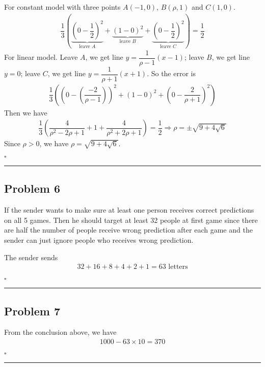 \documentclass[12pt]{article}
\newcommand*{\QEDB}{\hfill\ensuremath{\square}}
\newcommand{\ParTh}[1]{\left(#1\right)}
\newcommand{\horrule}[1]{\rule{\linewidth}{#1}}
\begin{document}
For constant model with three points $A\ParTh{-1,0}$, $B\ParTh{\rho,1}$ and $C\ParTh{1,0}$.
\begin{align}
\dfrac{1}{3}\ParTh{\underbrace{\ParTh{0-\dfrac{1}{2}}^2}_{\text{leave }A}+\underbrace{\ParTh{1-0}^2}_{\text{leave }B}+\underbrace{\ParTh{0-\dfrac{1}{2}}^2}_{\text{leave }C}}=\dfrac{1}{2}
\end{align}
For linear model. Leave $A$, we get line $y=\dfrac{1}{\rho-1}\ParTh{x-1}$; leave $B$, we get line $y=0$; leave $C$, we get line $y=\dfrac{1}{\rho+1}\ParTh{x+1}$. So the error is
\begin{align}
\dfrac{1}{3}\ParTh{\ParTh{0-\ParTh{\dfrac{-2}{\rho-1}}}^2+\ParTh{1-0}^2+\ParTh{0-\dfrac{2}{\rho+1}}^2}
\end{align}
Then we have
\begin{align}
\dfrac{1}{3}\ParTh{\dfrac{4}{{\rho^2-2\rho+1}}+1+\dfrac{4}{{\rho^2+2\rho+1}}}=\dfrac{1}{2}\Rightarrow\rho=\pm\sqrt{9+4\sqrt{6}}
\end{align}
Since $\rho>0$, we have $\rho=\sqrt{9+4\sqrt{6}}$.

\QEDB

\horrule{0.5pt}

\subsection*{Problem 6}

If the sender wants to make sure at least one person receives correct predictions on all 5 games. Then he should target at least 32 people at first game since there are half the number of people receive wrong prediction after each game and the sender can just ignore people who receives wrong prediction.

The sender sends
\begin{align}
32+16+8+4+2+1=63\text{ letters}
\end{align}

\QEDB

\horrule{0.5pt}

\subsection*{Problem 7}

From the conclusion above, we have
\begin{align}
1000-63\times10=370
\end{align}

\QEDB

\horrule{0.5pt}
\end{document}
